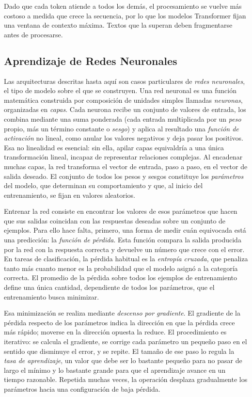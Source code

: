 Dado que cada token atiende a todos los demás, el procesamiento se vuelve más costoso a medida que crece la secuencia, por lo que los modelos Transformer fijan una ventana de contexto máxima. Textos que la superan deben fragmentarse antes de procesarse.

\subsection{Aprendizaje de Redes Neuronales}
\label{subsec:aprendizaje}

Las arquitecturas descritas hasta aquí son casos particulares de \textit{redes neuronales}, el tipo de modelo sobre el que se construyen. Una red neuronal es una función matemática construida por composición de unidades simples llamadas \textit{neuronas}, organizadas en \textit{capas}. Cada neurona recibe un conjunto de valores de entrada, los combina mediante una suma ponderada (cada entrada multiplicada por un \textit{peso} propio, más un término constante o \textit{sesgo}) y aplica al resultado una \textit{función de activación} no lineal, como anular los valores negativos y deja pasar los positivos. Esa no linealidad es esencial: sin ella, apilar capas equivaldría a una única transformación lineal, incapaz de representar relaciones complejas. Al encadenar muchas capas, la red transforma el vector de entrada, paso a paso, en el vector de salida deseado. El conjunto de todos los pesos y sesgos constituye los \textit{parámetros} del modelo, que determinan su comportamiento y que, al inicio del entrenamiento, se fijan en valores aleatorios.

Entrenar la red consiste en encontrar los valores de esos parámetros que hacen que sus salidas coincidan con las respuestas deseadas sobre un conjunto de ejemplos. Para ello hace falta, primero, una forma de medir cuán equivocada está una predicción: la \textit{función de pérdida}. Esta función compara la salida producida por la red con la respuesta correcta y devuelve un número que crece con el error. En tareas de clasificación, la pérdida habitual es la \textit{entropía cruzada}, que penaliza tanto más cuanto menor es la probabilidad que el modelo asignó a la categoría correcta. El promedio de la pérdida sobre todos los ejemplos de entrenamiento define una única cantidad, dependiente de todos los parámetros, que el entrenamiento busca minimizar.

Esa minimización se realiza mediante \textit{descenso por gradiente}. El gradiente de la pérdida respecto de los parámetros indica la dirección en que la pérdida crece más rápido; moverse en la dirección opuesta la reduce. El procedimiento es iterativo: se calcula el gradiente, se corrige cada parámetro un pequeño paso en el sentido que disminuye el error, y se repite. El tamaño de ese paso lo regula la \textit{tasa de aprendizaje}, un valor que debe ser lo bastante pequeño para no pasar de largo el mínimo y lo bastante grande para que el aprendizaje avance en un tiempo razonable. Repetida muchas veces, la operación desplaza gradualmente los parámetros hacia una configuración de baja pérdida.

